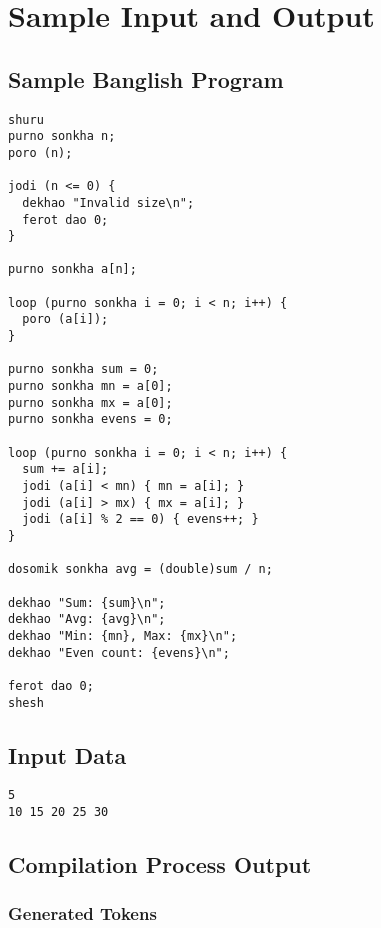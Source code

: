 \documentclass[12pt,a4paper]{article}
\begin{document}
\section{Sample Input and Output}

\subsection{Sample Banglish Program}

\begin{lstlisting}[caption=Sample Input: main.banglish]
shuru
purno sonkha n;
poro (n);

jodi (n <= 0) {
  dekhao "Invalid size\n";
  ferot dao 0;
}

purno sonkha a[n];

loop (purno sonkha i = 0; i < n; i++) {
  poro (a[i]);
}

purno sonkha sum = 0;
purno sonkha mn = a[0];
purno sonkha mx = a[0];
purno sonkha evens = 0;

loop (purno sonkha i = 0; i < n; i++) {
  sum += a[i];
  jodi (a[i] < mn) { mn = a[i]; }
  jodi (a[i] > mx) { mx = a[i]; }
  jodi (a[i] % 2 == 0) { evens++; }
}

dosomik sonkha avg = (double)sum / n;

dekhao "Sum: {sum}\n";
dekhao "Avg: {avg}\n";
dekhao "Min: {mn}, Max: {mx}\n";
dekhao "Even count: {evens}\n";

ferot dao 0;
shesh
\end{lstlisting}

\subsection{Input Data}

\begin{lstlisting}[caption=Sample Input: input.txt]
5
10 15 20 25 30
\end{lstlisting}

\subsection{Compilation Process Output}

\subsubsection{Generated Tokens}
\end{document}
